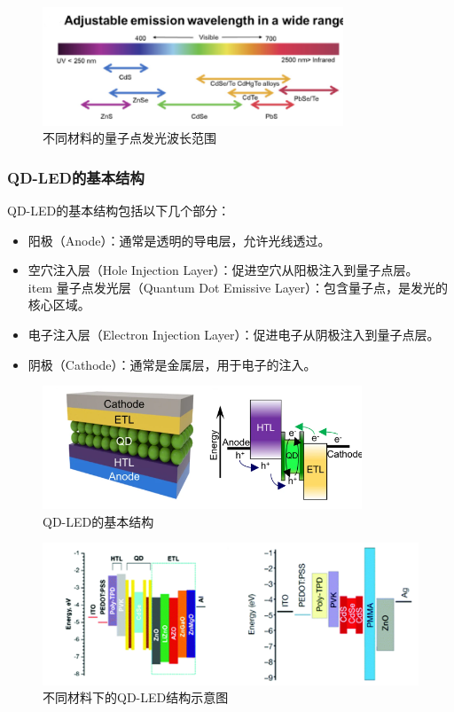 \documentclass[12pt,hyperref,a4paper,UTF8]{ctexart}
\begin{document}
\begin{figure}[H]
  \centering
  \includegraphics[width=0.8\textwidth]{figures/fig/image4.png} 
  \caption{不同材料的量子点发光波长范围\cite{qin2024structurally}}
\end{figure}

\subsubsection*{QD-LED的基本结构}
QD-LED的基本结构包括以下几个部分：
\begin{itemize}
  \item 阳极（Anode）：通常是透明的导电层，允许光线透过。
  \item 空穴注入层（Hole Injection Layer）：促进空穴从阳极注入到量子点层。
  \\item 量子点发光层（Quantum Dot Emissive Layer）：包含量子点，是发光的核心区域。
  \item 电子注入层（Electron Injection Layer）：促进电子从阴极注入到量子点层。
  \item 阴极（Cathode）：通常是金属层，用于电子的注入。
\end{itemize}

\begin{figure}[H]
  \centering
  \includegraphics[width=0.85\textwidth]{figures/fig/image6.png} 
  \caption{QD-LED的基本结构\cite{choi2018flexible}}
\end{figure}
\begin{figure}[H]
  \centering
  \includegraphics[width=1\textwidth]{figures/fig/image7.png} 
  \caption{不同材料下的QD-LED结构示意图\cite{bang2021technology}}
\end{figure}
\end{document}

